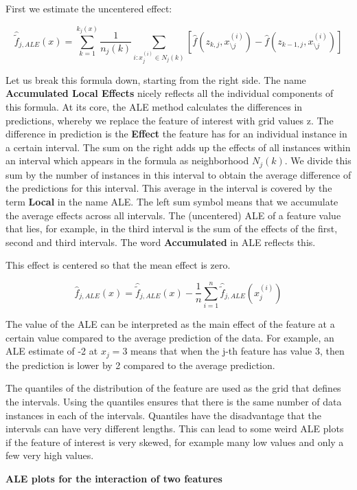 \documentclass[
  10pt,
]{scrbook}
\begin{document}
First we estimate the uncentered effect:

\[\hat{\tilde{f}}_{j,ALE}(x)=\sum_{k=1}^{k_j(x)}\frac{1}{n_j(k)}\sum_{i:x_{j}^{(i)}\in{}N_j(k)}\left[\hat{f}(z_{k,j},x^{(i)}_{\setminus{}j})-\hat{f}(z_{k-1,j},x^{(i)}_{\setminus{}j})\right]\]

Let us break this formula down, starting from the right side.
The name \textbf{Accumulated Local Effects} nicely reflects all the individual components of this formula.
At its core, the ALE method calculates the differences in predictions, whereby we replace the feature of interest with grid values z.
The difference in prediction is the \textbf{Effect} the feature has for an individual instance in a certain interval.
The sum on the right adds up the effects of all instances within an interval which appears in the formula as neighborhood \(N_j(k)\).
We divide this sum by the number of instances in this interval to obtain the average difference of the predictions for this interval.
This average in the interval is covered by the term \textbf{Local} in the name ALE.
The left sum symbol means that we accumulate the average effects across all intervals.
The (uncentered) ALE of a feature value that lies, for example, in the third interval is the sum of the effects of the first, second and third intervals.
The word \textbf{Accumulated} in ALE reflects this.

This effect is centered so that the mean effect is zero.

\[\hat{f}_{j,ALE}(x)=\hat{\tilde{f}}_{j,ALE}(x)-\frac{1}{n}\sum_{i=1}^{n}\hat{\tilde{f}}_{j,ALE}(x^{(i)}_{j})\]

The value of the ALE can be interpreted as the main effect of the feature at a certain value compared to the average prediction of the data.
For example, an ALE estimate of -2 at \(x_j=3\) means that when the j-th feature has value 3, then the prediction is lower by 2 compared to the average prediction.

The quantiles of the distribution of the feature are used as the grid that defines the intervals.
Using the quantiles ensures that there is the same number of data instances in each of the intervals.
Quantiles have the disadvantage that the intervals can have very different lengths.
This can lead to some weird ALE plots if the feature of interest is very skewed, for example many low values and only a few very high values.

\textbf{ALE plots for the interaction of two features}
\end{document}
